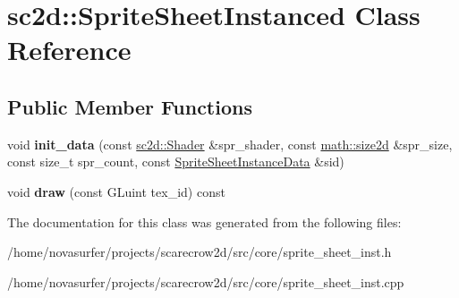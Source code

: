 \hypertarget{classsc2d_1_1SpriteSheetInstanced}{}\section{sc2d\+:\+:Sprite\+Sheet\+Instanced Class Reference}
\label{classsc2d_1_1SpriteSheetInstanced}
\subsection*{Public Member Functions}
\begin{DoxyCompactItemize}
\item 
\mbox{\label{classsc2d_1_1SpriteSheetInstanced_a1cb9e9e8a6d0798b0db2dfa42e9b5620}} 
void {\bfseries init\+\_\+data} (const \hyperlink{classsc2d_1_1Shader}{sc2d\+::\+Shader} \&spr\+\_\+shader, const \hyperlink{structmath_1_1size2d}{math\+::size2d} \&spr\+\_\+size, const size\+\_\+t spr\+\_\+count, const \hyperlink{structsc2d_1_1SpriteSheetInstanceData}{Sprite\+Sheet\+Instance\+Data} \&sid)
\item 
\mbox{\label{classsc2d_1_1SpriteSheetInstanced_ab743df9b3587a86a619d9c61eca8ba64}} 
void {\bfseries draw} (const G\+Luint tex\+\_\+id) const
\end{DoxyCompactItemize}


The documentation for this class was generated from the following files\+:\begin{DoxyCompactItemize}
\item 
/home/novasurfer/projects/scarecrow2d/src/core/sprite\+\_\+sheet\+\_\+inst.\+h\item 
/home/novasurfer/projects/scarecrow2d/src/core/sprite\+\_\+sheet\+\_\+inst.\+cpp\end{DoxyCompactItemize}
